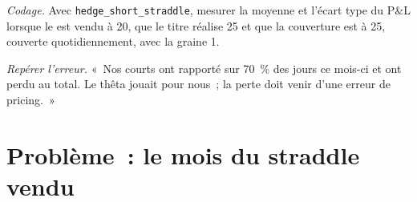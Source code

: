 \begin{exercise}[$\star\star\star$]\label{exo:dv:greeks-and-the-hedging-pnl:7}
\emph{Codage.} Avec \texttt{hedge\_short\_straddle}, mesurer la moyenne et l'écart type du P\&L
lorsque le  est vendu à 20, que le titre réalise 25 et que la
couverture est à 25, couverte quotidiennement, avec la graine 1.
\end{exercise}

\begin{exercise}[$\star\star\star$]\label{exo:dv:greeks-and-the-hedging-pnl:8}
\emph{Repérer l'erreur.} «~Nos  courts ont rapporté sur 70~\% des jours ce mois-ci
et ont perdu au total. Le thêta jouait pour nous~; la perte doit venir d'une erreur de pricing.~»
\end{exercise}

\section{Problème~: le mois du straddle vendu}

